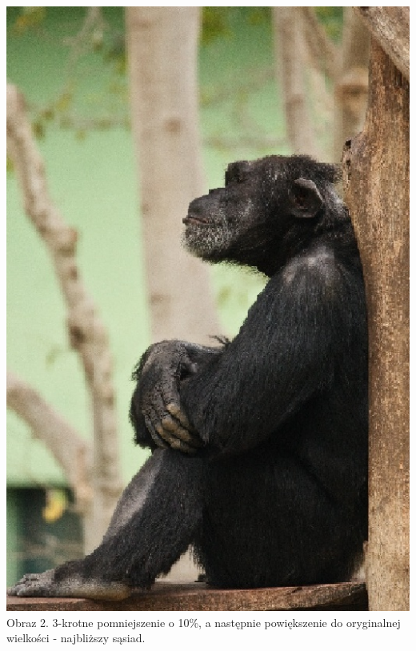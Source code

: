 \documentclass[14pt]{article}
\begin{document}
\begin{center}
    \vspace{0.2cm}
    \includegraphics[scale=0.3]{images/3x_BACK_TO_ORG_nn.jpg}
    \\ \small Obraz 2. 3-krotne pomniejszenie o 10\%, a następnie powiększenie
    do oryginalnej wielkości - najbliższy sąsiad.


\end{center}
\end{document}
